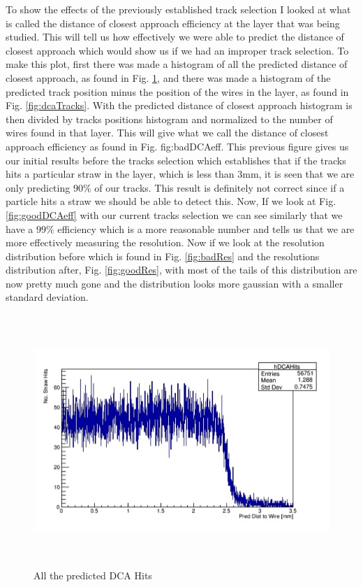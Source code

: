 \documentclass[./Thesis]{subfiles}
\begin{document}
	 To show the effects of the previously established track selection I looked at what is called the distance of closest approach efficiency at the layer that was being studied. This will tell us how effectively we were able to predict the distance of closest approach which would show us if we had an improper track selection. To make this plot, first there was made a histogram of all the predicted distance of closest approach, as found in Fig. \ref{fig:dcaHits}, and there was made a histogram of the predicted track position minus the position of the wires in the layer, as found in Fig. \ref{fig:dcaTracks}. With the predicted distance of closest approach histogram is then divided by tracks positions histogram and normalized to the number of wires found in that layer. This will give what we call the distance of closest approach efficiency as found in Fig. {fig:badDCAeff}. This previous figure gives us our initial results before the tracks selection which establishes that if the tracks hits a particular straw in the layer, which is less than 3mm, it is seen that we are only predicting $90\%$  of our tracks. This result is definitely not correct since if a particle hits a straw we should be able to detect this. Now, If we look at Fig. \ref{fig:goodDCAeff} with our current tracks selection we can see similarly that we have a $99\%$ efficiency which is a more reasonable number and tells us that we are more effectively measuring the resolution. Now if we look at the resolution distribution before which is found in Fig. \ref{fig:badRes} and the resolutions distribution after, Fig. \ref{fig:goodRes}, with most of the tails of this distribution are now pretty much gone and the distribution looks more gaussian with a smaller standard deviation.


\begin{figure}
	\centerline{\includegraphics[height=95mm]{DCAHits.jpeg}}
	\caption[dcaHits]{ All the predicted DCA Hits}
	\label{fig:dcaHits}
\end{figure} 	
\end{document}
